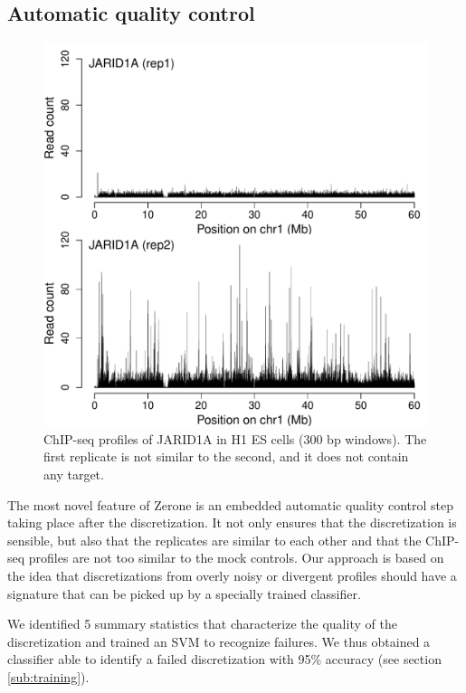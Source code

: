 \documentclass{bioinfo}
\begin{document}
\subsection{Automatic quality control}

\begin{figure}[!tpb]
\centerline{\includegraphics[scale=0.5]{jarid.pdf}}
\caption{
  ChIP-seq profiles of JARID1A in H1 ES cells (300 bp windows).
  The first replicate is not similar to the second, and it does not
  contain any target.
}\label{fig:jarid}
\end{figure}

The most novel feature of Zerone is an embedded automatic quality
control step taking place after the discretization. It not only
ensures that the discretization is sensible, but also that the
replicates are similar to each other and that the ChIP-seq profiles
are not too similar to the mock controls. Our approach is based
on the idea that discretizations from overly noisy or
divergent profiles should have a signature that
can be picked up by a specially trained classifier.

We identified 5 summary statistics that characterize the quality of
the discretization and trained an SVM to recognize failures. We thus
obtained a classifier able to identify a failed discretization with
95\% accuracy (see section \ref{sub:training}).
\end{document}
